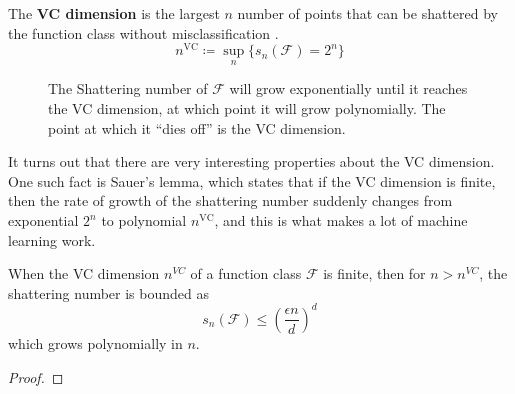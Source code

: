   \begin{definition}[VC Dimension]
    The \textbf{VC dimension} is the largest $n$ number of points that can be shattered by the function class without misclassification \cite{1971vapnik}. 
    \begin{equation}
      n^{\mathrm{VC}} \coloneqq \sup_n \{ s_n (\mathcal{F}) = 2^n \}
    \end{equation}

    \begin{figure}[H]
      \centering 
      \caption{The Shattering number of $\mathcal{F}$ will grow exponentially until it reaches the VC dimension, at which point it will grow polynomially. The point at which it ``dies off'' is the VC dimension.} 
      \label{fig:sawyer_lemma}
    \end{figure}
  \end{definition}

  It turns out that there are very interesting properties about the VC dimension. One such fact is Sauer's lemma, which states that if the VC dimension is finite, then the rate of growth of the shattering number suddenly changes from exponential $2^n$ to polynomial $n^{\mathrm{VC}}$, and this is what makes a lot of machine learning work. 

  \begin{lemma}
    When the VC dimension $n^{VC}$ of a function class $\mathcal{F}$ is finite, then for $n > n^{VC}$, the shattering number is bounded as 
    \begin{equation}
      s_n (\mathcal{F}) \leq \left( \frac{\epsilon n}{d} \right)^d
    \end{equation}
    which grows polynomially in $n$. 
  \end{lemma}
  \begin{proof}
    
  \end{proof}

